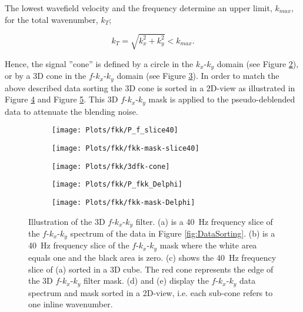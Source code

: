 \documentclass{madrid15WS}
\begin{document}
The lowest wavefield velocity and the frequency determine an upper limit, $k_{max}$, for the total wavenumber, $k_T$; 

\begin{equation}
	k_{T} = \sqrt{k_x^2 + k_y^2} < k_{max}.
	\label{eq:kT}
\end{equation}

Hence, the signal ”cone” is defined by a circle in the $k_x$-$k_y$ domain (see Figure \ref{fig:FK-f_slice-mask}), or by a 3D cone in the $f$-$k_x$-$k_y$ domain (see Figure \ref{fig:FK-f_slice-data3d}). In order to match the above described data sorting the 3D cone is sorted in a 2D-view as illustrated in Figure \ref{fig:FK-delphi-data} and Figure \ref{fig:FK-delphi-mask}. This 3D $f$-$k_x$-$k_y$ mask is applied to the pseudo-deblended data to attenuate the blending noise.

\begin{figure}[h!]
	\centering
	\begin{subfigure}[t]{0.3\textwidth}
		\centering
		\texttt{[image: Plots/fkk/P\_f\_slice40]}
		\caption{}
		\label{fig:FK-f_slice-data}
	\end{subfigure}
	\centering
	\begin{subfigure}[t]{0.3\textwidth}
		\centering
		\texttt{[image: Plots/fkk/fkk-mask-slice40]}
		\caption{}
		\label{fig:FK-f_slice-mask}
	\end{subfigure}
	\centering
	\begin{subfigure}[t]{0.3\textwidth}
		\centering
		\texttt{[image: Plots/fkk/3dfk-cone]}
		\caption{}
		\label{fig:FK-f_slice-data3d}
	\end{subfigure}
	
	\begin{subfigure}[t]{\textwidth}
		\centering
		\texttt{[image: Plots/fkk/P\_fkk\_Delphi]}
		\caption{}
		\label{fig:FK-delphi-data}
	\end{subfigure}
	\par\bigskip
	\begin{subfigure}[t]{\textwidth}
		\centering
		\texttt{[image: Plots/fkk/fkk-mask-Delphi]}
		\caption{}
		\label{fig:FK-delphi-mask}
	\end{subfigure}
	
	\caption{Illustration of the 3D $f$-$k_x$-$k_y$ filter. (a) is a \SI{40}{\hertz} frequency slice of the $f$-$k_x$-$k_y$ spectrum of the data in Figure \ref{fig:DataSorting}. (b) is a \SI{40}{\hertz} frequency slice of the $f$-$k_x$-$k_y$ mask where the white area equals one and the black area is zero. (c) shows the \SI{40}{\hertz} frequency slice of (a) sorted in a 3D cube. The red cone represents the edge of the 3D $f$-$k_x$-$k_y$ filter mask. (d) and (e) display the $f$-$k_x$-$k_y$ data spectrum and mask sorted in a 2D-view, i.e. each sub-cone refers to one inline wavenumber.}
	\label{fig:FKK-Mask}

\end{figure}
\end{document}
